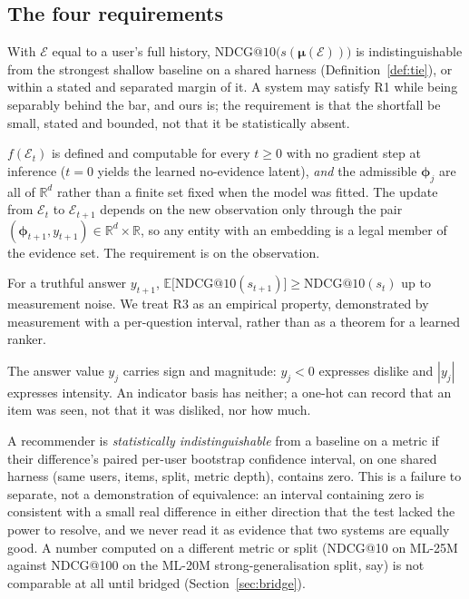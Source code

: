 \documentclass[manuscript,screen,review]{acmart}
\newcommand{\R}{\mathbb{R}}
\newcommand{\bphi}{\boldsymbol{\phi}}
\newcommand{\bmu}{\boldsymbol{\mu}}
\begin{document}
\subsection{The four requirements}
\begin{description}[leftmargin=2.4em,itemsep=1.5pt]
  \item[R1.] With $\mathcal E$ equal to a user's full history, $\mathrm{NDCG}@10\bigl(s(\bmu(\mathcal E))\bigr)$ is indistinguishable from the strongest shallow baseline on a shared harness (Definition~\ref{def:tie}), or within a stated and separated margin of it. A system may satisfy R1 while being separably behind the bar, and ours is; the requirement is that the shortfall be small, stated and bounded, not that it be statistically absent.
  \item[R2.] $f(\mathcal E_t)$ is defined and computable for every $t\ge 0$ with no gradient step at inference ($t{=}0$ yields the learned no-evidence latent), \emph{and} the admissible $\bphi_j$ are all of $\R^{d}$ rather than a finite set fixed when the model was fitted. The update from $\mathcal E_t$ to $\mathcal E_{t+1}$ depends on the new observation only through the pair $(\bphi_{t+1},y_{t+1})\in\R^{d}\times\R$, so any entity with an embedding is a legal member of the evidence set. The requirement is on the observation.
  \item[R3.] For a truthful answer $y_{t+1}$, $\mathbb E\bigl[\mathrm{NDCG}@10(s_{t+1})\bigr]\ge \mathrm{NDCG}@10(s_t)$ up to measurement noise. We treat R3 as an empirical property, demonstrated by measurement with a per-question interval, rather than as a theorem for a learned ranker.
  \item[R4.] The answer value $y_j$ carries sign and magnitude: $y_j<0$ expresses dislike and $|y_j|$ expresses intensity. An indicator basis has neither; a one-hot can record that an item was seen, not that it was disliked, nor how much.
\end{description}

\begin{definition}\label{def:tie}
A recommender is \emph{statistically indistinguishable} from a baseline on a metric if their difference's paired per-user bootstrap confidence interval, on one shared harness (same users, items, split, metric depth), contains zero. This is a failure to separate, not a demonstration of equivalence: an interval containing zero is consistent with a small real difference in either direction that the test lacked the power to resolve, and we never read it as evidence that two systems are equally good. A number computed on a different metric or split (NDCG@10 on ML-25M against NDCG@100 on the ML-20M strong-generalisation split, say) is not comparable at all until bridged (Section~\ref{sec:bridge}).
\end{definition}
\end{document}
